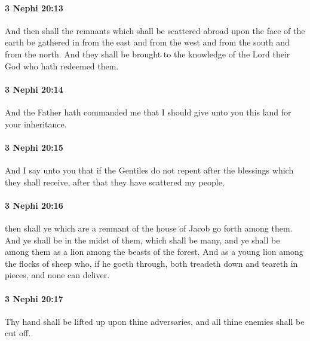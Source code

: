 		\paragraph{3 Nephi 20:13} %
			\label{3NEPHI-20-13}

			And then shall the remnants
			which shall be scattered abroad upon the face of the earth
			be gathered in from the east and from the west
			and from the south and from the north.
			And they shall be brought to the knowledge
			of the Lord their God who hath redeemed them.

		\paragraph{3 Nephi 20:14} %
			\label{3NEPHI-20-14}

			And the Father hath commanded me
			that I should give unto you this land for your inheritance.

		\paragraph{3 Nephi 20:15} %
			\label{3NEPHI-20-15}

			And I say unto you that if the Gentiles do not repent
			after the blessings which they shall receive,
			after that they have scattered my people,

		\paragraph{3 Nephi 20:16} %
			\label{3NEPHI-20-16}

			then shall ye which are a remnant of the house of Jacob go forth among them.
			And ye shall be in the midst of them, which shall be many,
			and ye shall be among them as a lion among the beasts of the forest.
			And as a young lion among the flocks of sheep
			who, if he goeth through, both treadeth down and teareth in pieces,
			and none can deliver.

		\paragraph{3 Nephi 20:17} %
			\label{3NEPHI-20-17}

			Thy hand shall be lifted up upon thine adversaries,
			and all thine enemies shall be cut off.

